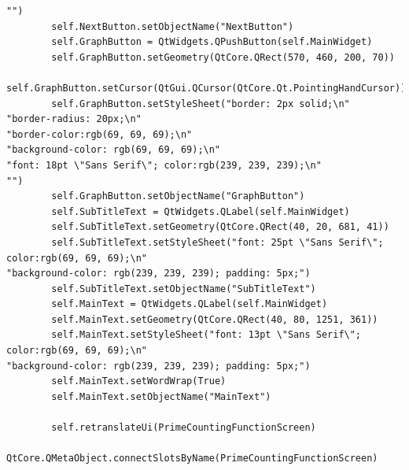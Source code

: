 \documentclass{article}
\begin{document}
\begin{lstlisting}
"")
        self.NextButton.setObjectName("NextButton")
        self.GraphButton = QtWidgets.QPushButton(self.MainWidget)
        self.GraphButton.setGeometry(QtCore.QRect(570, 460, 200, 70))
        self.GraphButton.setCursor(QtGui.QCursor(QtCore.Qt.PointingHandCursor))
        self.GraphButton.setStyleSheet("border: 2px solid;\n"
"border-radius: 20px;\n"
"border-color:rgb(69, 69, 69);\n"
"background-color: rgb(69, 69, 69);\n"
"font: 18pt \"Sans Serif\"; color:rgb(239, 239, 239);\n"
"")
        self.GraphButton.setObjectName("GraphButton")
        self.SubTitleText = QtWidgets.QLabel(self.MainWidget)
        self.SubTitleText.setGeometry(QtCore.QRect(40, 20, 681, 41))
        self.SubTitleText.setStyleSheet("font: 25pt \"Sans Serif\"; color:rgb(69, 69, 69);\n"
"background-color: rgb(239, 239, 239); padding: 5px;")
        self.SubTitleText.setObjectName("SubTitleText")
        self.MainText = QtWidgets.QLabel(self.MainWidget)
        self.MainText.setGeometry(QtCore.QRect(40, 80, 1251, 361))
        self.MainText.setStyleSheet("font: 13pt \"Sans Serif\"; color:rgb(69, 69, 69);\n"
"background-color: rgb(239, 239, 239); padding: 5px;")
        self.MainText.setWordWrap(True)
        self.MainText.setObjectName("MainText")

        self.retranslateUi(PrimeCountingFunctionScreen)
        QtCore.QMetaObject.connectSlotsByName(PrimeCountingFunctionScreen)


\end{lstlisting}
\end{document}
